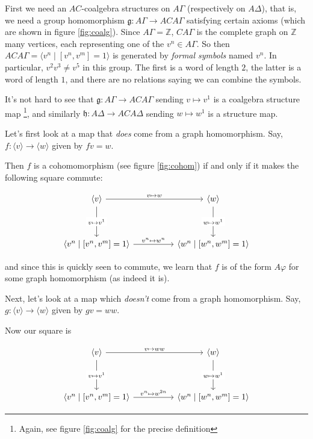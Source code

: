 \documentclass[12pt]{article}
\theoremstyle{definition}
\theoremstyle{theorem}
\begin{document}
First we need an $AC$-coalgebra structures on $A \Gamma$ 
(respectively on $A \Delta$), that is, 
we need a group homomorphism $\mathfrak{g} : A \Gamma \to ACA \Gamma$ 
satisfying certain axioms (which are shown in figure \ref{fig:coalg}).
Since $A \Gamma = \mathbb{Z}$, $CA \Gamma$ is the complete graph on 
$\mathbb{Z}$ many vertices, each representing one of the $v^n \in A \Gamma$.
So then $ACA\Gamma = \langle v^n \mid [v^n, v^m] = 1 \rangle$
is generated by \emph{formal symbols} named $v^n$. In particular,
$v^2 v^3 \neq v^5$ in this group. The first is a word of length $2$, the latter
is a word of length $1$, and there are no relations saying we can combine
the symbols.

It's not hard to see that $\mathfrak{g} : A \Gamma \to ACA \Gamma$ sending 
$v \mapsto v^1$ is a coalgebra structure map%
\footnote{Again, see figure \ref{fig:coalg} for the precise definition},
and similarly $\mathfrak{h} : A \Delta \to ACA \Delta$ sending 
$w \mapsto w^1$ is a structure map.

\bigskip

Let's first look at a map that \emph{does} come from a graph homomorphism.
Say, $f : \langle v \rangle \to \langle w \rangle$ given by $fv = w$.

Then $f$ is a cohomomorphism (see figure \ref{fig:cohom})
if and only if it makes the following square commute:

\[\begin{tikzcd}
	{\langle v \rangle} && {\langle w \rangle} \\
	\\
	{\langle v^n \mid [v^n,v^m] = 1 \rangle} && {\langle w^n \mid [w^n, w^m] = 1 \rangle}
	\arrow["{v \mapsto w}", from=1-1, to=1-3]
	\arrow["{v^n \mapsto w^n}", from=3-1, to=3-3]
	\arrow["{v \mapsto v^1}"{description}, from=1-1, to=3-1]
	\arrow["{w \mapsto w^1}"{description}, from=1-3, to=3-3]
\end{tikzcd}\]

and since this is quickly seen to commute, we learn that $f$ is of the form 
$A \varphi$ for some graph homomorphism (as indeed it is).

\bigskip

Next, let's look at a map which \emph{doesn't} come from a graph homomorphism.
Say, $g : \langle v \rangle \to \langle w \rangle$ given by $gv = ww$.

Now our square is

\[\begin{tikzcd}
	{\langle v \rangle} && {\langle w \rangle} \\
	\\
	{\langle v^n \mid [v^n,v^m] = 1 \rangle} && {\langle w^n \mid [w^n, w^m] = 1 \rangle}
	\arrow["{v \mapsto ww}", from=1-1, to=1-3]
  \arrow["{v^n \mapsto w^{2n}}", from=3-1, to=3-3]
	\arrow["{v \mapsto v^1}"{description}, from=1-1, to=3-1]
	\arrow["{w \mapsto w^1}"{description}, from=1-3, to=3-3]
\end{tikzcd}\]
\end{document}
